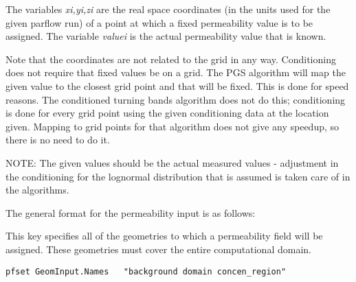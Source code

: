 The variables {\em xi,yi,zi} are the real space coordinates (in the
units used for the given parflow run) of
a point at which a fixed permeability value
is to be assigned. The variable {\em valuei} is the actual permeability
value that is known.

Note that the coordinates
are not related to the grid in any way. Conditioning
does not require that fixed values be on a
grid. The PGS algorithm
will map the given value to the closest grid point
and that will be fixed. This is done for speed reasons.
The conditioned turning bands algorithm does not do
this; conditioning is done for every grid point using
the given conditioning data at the location given.
Mapping to grid points for that algorithm does not give
any speedup, so there is no need to do it.

NOTE: The given values should be the actual measured
values - adjustment in the conditioning for the lognormal
distribution that is assumed is taken care of in the algorithms.

The general format for the permeability input is as follows:

{
This key specifies all of the geometries to which a permeability field
will be assigned.  These geometries must cover the entire computational
domain.
}
\begin{display}\begin{verbatim}
pfset GeomInput.Names   "background domain concen_region"
\end{verbatim}\end{display}

